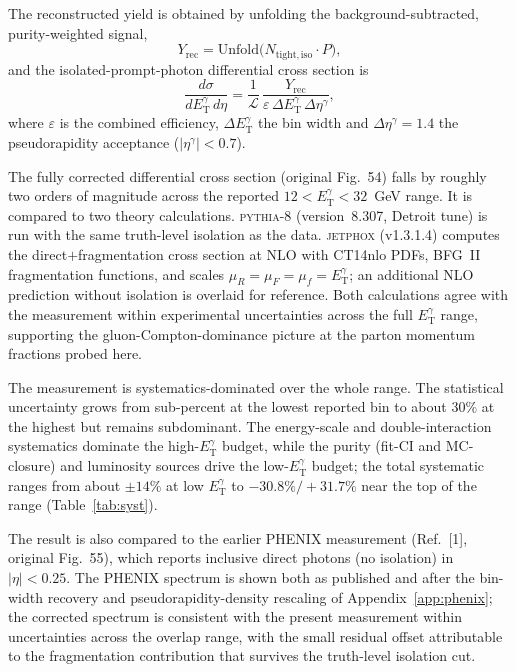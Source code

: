 \documentclass[11pt]{article}
\newcommand{\ETg}{E_{\mathrm{T}}^{\gamma}}
\begin{document}
The reconstructed yield is obtained by unfolding the background-subtracted,
purity-weighted signal,
\begin{equation}
  Y_{\mathrm{rec}} = \mathrm{Unfold}\big(N_{\mathrm{tight,iso}}\cdot P\big),
\end{equation}
and the isolated-prompt-photon differential cross section is
\begin{equation}
  \frac{d\sigma}{d\ETg\,d\eta}
  = \frac{1}{\mathcal{L}}\,
    \frac{Y_{\mathrm{rec}}}{\varepsilon\,\Delta\ETg\,\Delta\eta^{\gamma}},
\end{equation}
where $\varepsilon$ is the combined efficiency, $\Delta\ETg$ the bin width and
$\Delta\eta^{\gamma}=1.4$ the pseudorapidity acceptance ($|\eta^{\gamma}|<0.7$).

The fully corrected differential cross section (original Fig.~54) falls by
roughly two orders of magnitude across the reported $12<\ETg<32$~GeV range. It is
compared to two theory calculations. \textsc{pythia-8} (version~8.307, Detroit
tune) is run with the same truth-level isolation as the data.
\textsc{jetphox} (v1.3.1.4) computes the direct$+$fragmentation cross section at
NLO with CT14nlo PDFs, BFG~II fragmentation functions, and scales
$\mu_R=\mu_F=\mu_f=\ETg$; an additional NLO prediction without isolation is
overlaid for reference. Both calculations agree with the measurement within
experimental uncertainties across the full $\ETg$ range, supporting the
gluon-Compton-dominance picture at the parton momentum fractions probed here.

The measurement is systematics-dominated over the whole range. The statistical
uncertainty grows from sub-percent at the lowest reported bin to about $30\%$ at
the highest but remains subdominant. The energy-scale and double-interaction
systematics dominate the high-$\ETg$ budget, while the purity (fit-CI and
MC-closure) and luminosity sources drive the low-$\ETg$ budget; the total
systematic ranges from about $\pm14\%$ at low $\ETg$ to $-30.8\%/+31.7\%$ near the
top of the range (Table~\ref{tab:syst}).

The result is also compared to the earlier PHENIX measurement (Ref.~[1], original
Fig.~55), which reports inclusive direct photons (no isolation) in $|\eta|<0.25$.
The PHENIX spectrum is shown both as published and after the bin-width recovery
and pseudorapidity-density rescaling of Appendix~\ref{app:phenix}; the corrected
spectrum is consistent with the present measurement within uncertainties across
the overlap range, with the small residual offset attributable to the
fragmentation contribution that survives the truth-level isolation cut.
\end{document}
